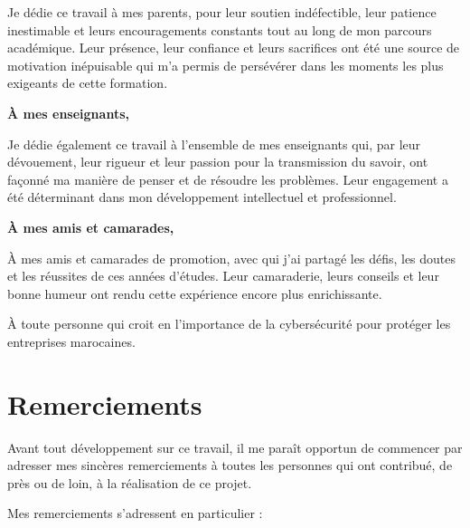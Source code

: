 \documentclass[12pt, a4paper, oneside]{report}
\begin{document}
Je dédie ce travail à mes parents, pour leur soutien indéfectible, leur patience inestimable et leurs encouragements constants tout au long de mon parcours académique. Leur présence, leur confiance et leurs sacrifices ont été une source de motivation inépuisable qui m'a permis de persévérer dans les moments les plus exigeants de cette formation.

\begin{center}
{\large\bfseries À mes enseignants,}
\end{center}

Je dédie également ce travail à l'ensemble de mes enseignants qui, par leur dévouement, leur rigueur et leur passion pour la transmission du savoir, ont façonné ma manière de penser et de résoudre les problèmes. Leur engagement a été déterminant dans mon développement intellectuel et professionnel.

\begin{center}
{\large\bfseries À mes amis et camarades,}
\end{center}

À mes amis et camarades de promotion, avec qui j'ai partagé les défis, les doutes et les réussites de ces années d'études. Leur camaraderie, leurs conseils et leur bonne humeur ont rendu cette expérience encore plus enrichissante.

\begin{center}
À toute personne qui croit en l'importance de la cybersécurité pour protéger les entreprises marocaines.
\end{center}

\newpage


\chapter*{Remerciements}

Avant tout développement sur ce travail, il me paraît opportun de commencer par adresser mes sincères remerciements à toutes les personnes qui ont contribué, de près ou de loin, à la réalisation de ce projet.

Mes remerciements s'adressent en particulier :
\end{document}

